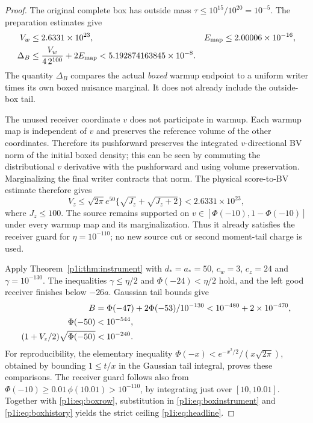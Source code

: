 \documentclass[11pt]{article}
\numberwithin{equation}{section}
\theoremstyle{definition}
\theoremstyle{remark}
\begin{document}
\begin{proof}
The original complete box has outside mass
$\tau\leq10^{15}/10^{20}=10^{-5}$. The preparation estimates give
\begin{align}
 V_w&\leq2.6331\times10^{23},&
 E_{\rm map}&\leq2.00006\times10^{-16},\notag\\
 \Delta_B&\leq\frac{V_w}{4\,2^{100}}+2E_{\rm map}
                  <5.192874163845\times10^{-8}.\label{p1i:eq:boxrow}
\end{align}
The quantity $\Delta_B$ compares the actual \emph{boxed} warmup endpoint
to a uniform writer times its own boxed nuisance marginal. It does not
already include the outside-box tail.

The unused receiver coordinate $v$ does not participate in warmup.
Each warmup map is independent of $v$ and preserves the reference volume
of the other coordinates. Therefore its pushforward preserves the
integrated $v$-directional BV norm of the initial boxed density; this can
be seen by commuting the distributional $v$ derivative with the
pushforward and using volume preservation. Marginalizing the final
writer contracts that norm. The physical score-to-BV estimate therefore
gives
\begin{equation}\label{p1i:eq:sourcevariation}
 V_z\leq\sqrt{2\pi}e^{50}
                \{\sqrt{J_z}+\sqrt{J_z+2}\}
        <2.6331\times10^{23},
\end{equation}
where $J_z\leq100$. The source remains supported on
$v\in[\Phi(-10),1-\Phi(-10)]$ under every warmup map and its
marginalization. Thus it already satisfies the receiver guard for
$\eta=10^{-110}$; no new source cut or second moment-tail charge is used.

Apply Theorem~\ref{p1i:thm:instrument} with
$d_*=a_*=50$, $c_w=3$, $c_z=24$ and $\gamma=10^{-130}$.
The inequalities $\gamma\leq\eta/2$ and $\Phi(-24)<\eta/2$ hold, and
the left good receiver finishes below $-26a$. Gaussian tail bounds give
\begin{align}
 B&=\Phi(-47)+2\Phi(-53)/10^{-130}<10^{-480}+2\times10^{-470},
 \notag\\
 \Phi(-50)&<10^{-544},\notag\\
 (1+V_z/2)\sqrt{\Phi(-50)}&<10^{-240}.
 \label{p1i:eq:smallfees}
\end{align}
For reproducibility, the elementary inequality
$\Phi(-x)<e^{-x^2/2}/(x\sqrt{2\pi})$, obtained by bounding
$1\leq t/x$ in the Gaussian tail integral, proves these comparisons.
The receiver guard follows also from
$\Phi(-10)\geq0.01\,\phi(10.01)>10^{-110}$, by integrating just over
$[10,10.01]$. Together with \eqref{p1i:eq:boxrow}, substitution in
\eqref{p1i:eq:boxinstrument} and \eqref{p1i:eq:boxhistory} yields the
strict ceiling \eqref{p1i:eq:headline}.
\end{proof}
\end{document}
